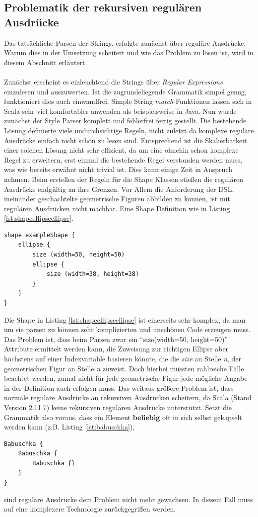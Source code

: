\subsection{Problematik der rekursiven regulären Ausdrücke}
Das tatsächliche Parsen der Strings, erfolgte zunächst über reguläre Ausdrücke. Warum dies in der Umsetzung scheitert und wie das Problem zu lösen ist, wird in diesem Abschnitt erläutert.\\\\Zunächst erscheint es einleuchtend die Strings über \textit{Regular Expressions} einzulesen und auszuwerten. Ist die zugrundeliegende Grammatik simpel genug, funktioniert dies auch einwandfrei. Simple String \textit{match}-Funktionen lassen sich in Scala sehr viel komfortabler anwenden als beispielsweise in Java. Nun wurde zunächst der Style Parser komplett und fehlerfrei fertig gestellt. Die bestehende Lösung definierte viele undurchsichtige Regeln, nicht zuletzt da komplexe reguläre Ausdrücke einfach nicht schön zu lesen sind. Entsprechend ist die Skalierbarkeit einer solchen Lösung nicht sehr effizient, da um eine ohnehin schon komplexe Regel zu erweitern, erst einmal die bestehende Regel verstanden werden muss, was wie bereits erwähnt nicht trivial ist. Dies kann einige Zeit in Anspruch nehmen. Beim erstellen der Regeln für die Shape Klassen stießen die regulären Ausdrücke endgültig an ihre Grenzen. Vor Allem die Anforderung der DSL, ineinander geschachtelte geometrische Figuren abbilden zu können, ist mit regulären Ausdrücken nicht machbar. Eine Shape Definition wie in Listing \ref{lst:shapeellipseellipse}.
\begin{lstlisting}[style=spray, caption = {Beispielhafte Shapedefinition}, label = {lst:shapeellipseellipse}]
shape exampleShape {
    ellipse {
        size (width=50, height=50)
        ellipse {
            size (width=38, height=38)
        }
    }
}
\end{lstlisting} Die Shape in Listing \ref{lst:shapeellipseellipse} ist einerseits sehr komplex, da man um sie parsen zu können sehr komplizierten und unschönen Code erzeugen muss. Das Problem ist, dass beim Parsen zwar ein "`size(width=50, height=50)"' Attribute ermittelt werden kann, die Zuweisung zur richtigen Ellipse aber höchstens auf einer Indexvariable basieren könnte, die die \textit{size} an Stelle \textit{n}, der geometrischen Figur an Stelle \textit{n} zuweist. Doch hierbei müssten zahlreiche Fälle beachtet werden, zumal nicht für jede geometrische Figur jede mögliche Angabe in der Definition auch erfolgen muss. Das weitaus größere Problem ist,
dass normale reguläre Ausdrücke an rekursiven Ausdrücken scheitern, da Scala (Stand Version 2.11.7) keine rekursiven regulären Ausdrücke unterstützt. Setzt die Grammatik also voraus, dass ein Element \textbf{beliebig} oft in sich selbst gekapselt werden kann (z.B. Listing \ref{lst:babuschka}),
\begin{lstlisting}[style=scala, caption = {Beispiel für eine rekursive Grammatik anhand der russischen \textit{Babuschka} Puppen}, label = {lst:babuschka}]
Babuschka {
    Babuschka {
        Babuschka {}
    }
}
\end{lstlisting}sind reguläre Ausdrücke dem Problem nicht mehr gewachsen.
In diesem Fall muss auf eine komplexere Technologie zurückgegriffen werden.
